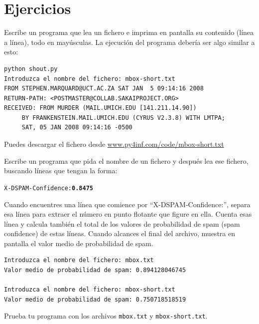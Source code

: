 \section{Ejercicios}

\begin{ex}
Escribe un programa que lea un fichero e imprima en pantalla su contenido
(línea a línea), todo en mayúsculas. La ejecución del programa debería
ser algo similar a esto:

\beforeverb
\begin{verbatim}
python shout.py
Introduzca el nombre del fichero: mbox-short.txt
FROM STEPHEN.MARQUARD@UCT.AC.ZA SAT JAN  5 09:14:16 2008
RETURN-PATH: <POSTMASTER@COLLAB.SAKAIPROJECT.ORG>
RECEIVED: FROM MURDER (MAIL.UMICH.EDU [141.211.14.90])
	 BY FRANKENSTEIN.MAIL.UMICH.EDU (CYRUS V2.3.8) WITH LMTPA;
	 SAT, 05 JAN 2008 09:14:16 -0500
\end{verbatim}
\afterverb
%
Puedes descargar el fichero desde
\url{www.py4inf.com/code/mbox-short.txt}
\end{ex}

\begin{ex}
Escribe un programa
que pida el nombre de un fichero y después lea ese fichero,
buscando líneas que tengan la forma:

\beforeverb
\begin{alltt}
X-DSPAM-Confidence: {\bf 0.8475}
\end{alltt}
\afterverb

Cuando encuentres una línea que comience por
``X-DSPAM-Confidence:'', separa esa línea para extraer
el número en punto flotante que figure en ella. Cuenta esas línea y
calcula también el total de los valores de probabilidad de spam (spam confidence)
de estas líneas. Cuando alcances el final del archivo, muestra en pantalla
el valor medio de probabilidad de spam.

\beforeverb
\begin{verbatim}
Introduzca el nombre del fichero: mbox.txt
Valor medio de probabilidad de spam: 0.894128046745

Introduzca el nombre del fichero: mbox-short.txt
Valor medio de probabilidad de spam: 0.750718518519
\end{verbatim}
\afterverb
%
Prueba tu programa con los archivos {\tt mbox.txt} y {\tt mbox-short.txt}.
\end{ex}


